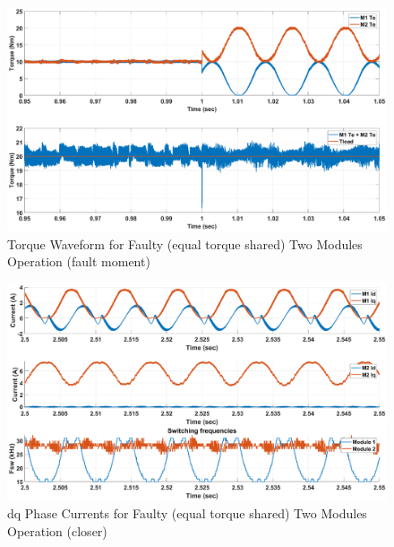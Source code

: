 \documentclass{article}
\begin{document}
\begin{figure}[H]
\centering
\includegraphics[scale=0.35]{SimulationResults/two_modules/faulty_torqueshared/tref_tload_close.eps}
\caption{Torque Waveform for Faulty (equal torque shared) Two Modules Operation (fault moment)}
\label{fig:TorqueTwoModulesFaultyEqualTorqueClose}
\end{figure}

\begin{figure}[H]
\centering
\includegraphics[scale=0.35]{SimulationResults/two_modules/faulty_torqueshared/Idq_iqripple_fsw_close.eps}
\caption{dq Phase Currents for Faulty (equal torque shared) Two Modules Operation (closer)}
\label{fig:PhaseCurrentsDqTwoModulesFaultyEqualTorqueClose}
\end{figure}



\end{document}
